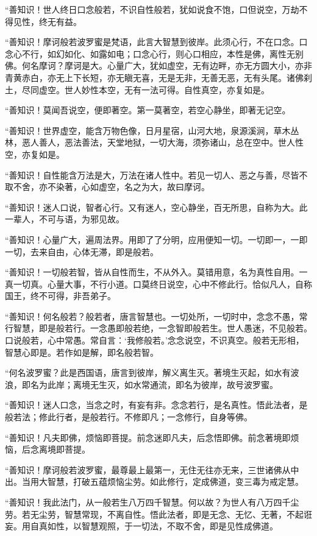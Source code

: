 \documentclass[UTF8, 11pt, oneside]{ctexart}
\begin{document}
“善知识！世人终日口念般若，不识自性般若，犹如说食不饱，口但说空，万劫不得见性，终无有益。

“善知识！摩诃般若波罗蜜是梵语，此言大智慧到彼岸。此须心行，不在口念。口念心不行，如幻如化、如露如电；口念心行，则心口相应，本性是佛，离性无别佛。何名摩诃？摩诃是大。心量广大，犹如虚空，无有边畔，亦无方圆大小，亦非青黄赤白，亦无上下长短，亦无瞋无喜，无是无非，无善无恶，无有头尾。诸佛刹土，尽同虚空。世人妙性本空，无有一法可得。自性真空，亦复如是。

“善知识！莫闻吾说空，便即著空。第一莫著空，若空心静坐，即著无记空。

“善知识！世界虚空，能含万物色像，日月星宿，山河大地，泉源溪涧，草木丛林，恶人善人，恶法善法，天堂地狱，一切大海，须弥诸山，总在空中。世人性空，亦复如是。

“善知识！自性能含万法是大，万法在诸人性中。若见一切人、恶之与善，尽皆不取不舍，亦不染著，心如虚空，名之为大，故曰摩诃。

“善知识！迷人口说，智者心行。又有迷人，空心静坐，百无所思，自称为大。此一辈人，不可与语，为邪见故。

“善知识！心量广大，遍周法界。用即了了分明，应用便知一切。一切即一，一即一切，去来自由，心体无滞，即是般若。

“善知识！一切般若智，皆从自性而生，不从外入。莫错用意，名为真性自用。一真一切真。心量大事，不行小道。口莫终日说空，心中不修此行。恰似凡人，自称国王，终不可得，非吾弟子。

“善知识！何名般若？般若者，唐言智慧也。一切处所，一切时中，念念不愚，常行智慧，即是般若行。一念愚即般若绝，一念智即般若生。世人愚迷，不见般若。口说般若，心中常愚。常自言：‘我修般若。’念念说空，不识真空。般若无形相，智慧心即是。若作如是解，即名般若智。

“何名波罗蜜？此是西国语，唐言到彼岸，解义离生灭。著境生灭起，如水有波浪，即名为此岸；离境无生灭，如水常通流，即名为彼岸，故号波罗蜜。

“善知识！迷人口念，当念之时，有妄有非。念念若行，是名真性。悟此法者，是般若法；修此行者，是般若行。不修即凡；一念修行，自身等佛。

“善知识！凡夫即佛，烦恼即菩提。前念迷即凡夫，后念悟即佛。前念著境即烦恼，后念离境即菩提。

“善知识！摩诃般若波罗蜜，最尊最上最第一，无住无往亦无来，三世诸佛从中出。当用大智慧，打破五蕴烦恼尘劳。如此修行，定成佛道，变三毒为戒定慧。

“善知识！我此法门，从一般若生八万四千智慧。何以故？为世人有八万四千尘劳。若无尘劳，智慧常现，不离自性。悟此法者，即是无念、无忆、无著，不起诳妄。用自真如性，以智慧观照，于一切法，不取不舍，即是见性成佛道。
\end{document}
